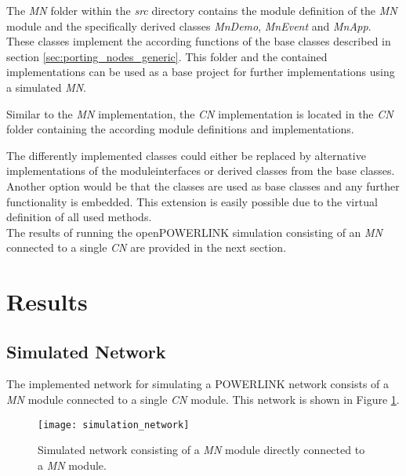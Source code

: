 The \emph{MN} folder within the \emph{src} directory contains the module definition of the \emph{MN} module and the specifically derived classes \emph{MnDemo}, \emph{MnEvent} and \emph{MnApp}.
These classes implement the according functions of the base classes described in section \ref{sec:porting_nodes_generic}.
This folder and the contained implementations can be used as a base project for further implementations using a simulated \emph{MN}.

Similar to the \emph{MN} implementation, the \emph{CN} implementation is located in the \emph{CN} folder containing the according module definitions and implementations.

The differently implemented classes could either be replaced by alternative implementations of the moduleinterfaces or derived classes from the base classes.
Another option would be that the classes are used as base classes and any further functionality is embedded.
This extension is easily possible due to the virtual definition of all used methods.
\\

The results of running the openPOWERLINK simulation consisting of an \emph{MN} connected to a single \emph{CN} are provided in the next section.

\section{Results}
\label{sec:porting_results}

\subsection{Simulated Network}
\label{sec:porting_results_network}
The implemented network for simulating a POWERLINK network consists of a \emph{MN} module connected to a single \emph{CN} module.
This network is shown in Figure \ref{fig:simulation_network}.

\begin{figure}
    \centering
    \texttt{[image: simulation\_network]}
    \caption{Simulated network consisting of a \emph{MN} module directly connected to a \emph{MN} module.}
    \label{fig:simulation_network}
\end{figure}